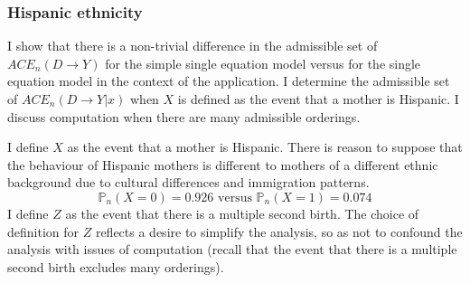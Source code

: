 \documentclass[12pt,a4paper,twoside]{article}
\numberwithin{equation}{section}
\begin{document}
\subsubsection{Hispanic ethnicity}
I show that there is a non-trivial difference in the admissible set of $ACE_n(D\rightarrow Y)$ for the simple single equation model versus for the single equation model in the context of the application. I determine the admissible set of $ACE_n(D\rightarrow Y|x)$ when $X$ is defined as the event that a mother is Hispanic. I discuss computation when there are many admissible orderings. 

I define $X$ as the event that a mother is Hispanic. There is reason to suppose that the behaviour of Hispanic mothers is different to mothers of a different ethnic background due to cultural differences and immigration patterns.   
\[\mathbb{P}_n(X=0)=0.926\text{ versus }\mathbb{P}_n(X=1)=0.074\] 
I define $Z$ as the event that there is a multiple second birth. The choice of definition for $Z$ reflects a desire to simplify the analysis, so as not to confound the analysis with issues of computation (recall that the event that there is a multiple second birth excludes many orderings).
\end{document}
